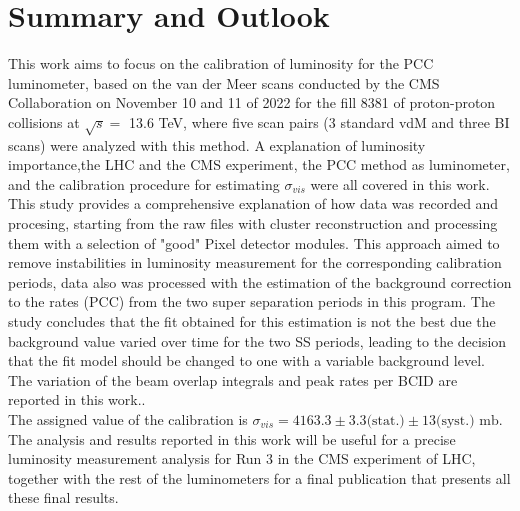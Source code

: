 \chapter{Summary and Outlook}

This work aims to focus on the calibration of luminosity for the PCC  luminometer, based on the van der Meer scans conducted by the CMS Collaboration on November 10 and 11 of 2022 for the fill 8381 of proton-proton collisions at $\sqrt{s}=$ 13.6 TeV, where five scan pairs (3 standard vdM and three BI scans) were analyzed with this method.
A explanation of luminosity importance,the LHC and the CMS experiment, the PCC method as luminometer, and the calibration procedure for estimating $\sigma_{vis}$ were all covered in this work.\\

This study provides a comprehensive explanation of how data was recorded and procesing, starting from the raw files with cluster reconstruction and processing them with a  selection of  "good" Pixel detector modules. This approach aimed to remove instabilities in luminosity measurement for the corresponding calibration periods,  data also was processed with the  estimation of the background correction to the rates (PCC) from the two super separation periods in this program. The study concludes that the fit obtained for this  estimation is not the best due the background value varied over time for the two SS periods, leading to the decision that the fit model should be changed to one with a variable background level. The variation of the beam overlap integrals and peak rates per BCID are reported in this work..\\

The assigned value of the calibration is $\sigma_{vis} = 4163.3 \pm 3.3 \text{(stat.)} \pm 13 \text{(syst.)} \text{ mb}$. The analysis and results reported in this work will be useful for a precise luminosity measurement analysis for Run 3 in the CMS experiment of LHC, together with the rest of the luminometers  for a final publication that presents all these final results.
